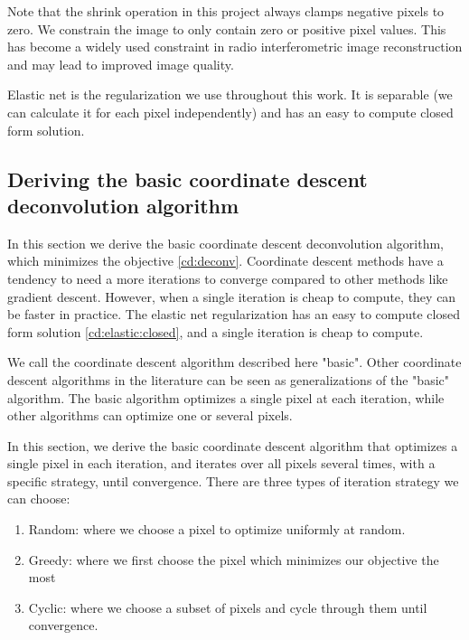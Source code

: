 
Note that the shrink operation in this project always clamps negative pixels to zero. We constrain the image to only contain zero or positive pixel values. This has become a widely used constraint in radio interferometric image reconstruction and may lead to improved image quality\cite{mcewen2011compressed}.

Elastic net is the regularization we use throughout this work. It is separable (we can calculate it for each pixel independently) and has an easy to compute closed form solution.


\subsection{Deriving the basic coordinate descent deconvolution algorithm}\label{cd:deriving}
In this section we derive the basic coordinate descent deconvolution algorithm, which minimizes the objective \eqref{cd:deconv}. Coordinate descent methods have a tendency to need a more iterations to converge compared to other methods like gradient descent. However, when a single iteration is cheap to compute, they can be faster in practice\cite{shalev2011stochastic}. The elastic net regularization has an easy to compute closed form solution \eqref{cd:elastic:closed}, and a single iteration is cheap to compute.

We call the coordinate descent algorithm described here "basic". Other coordinate descent algorithms in the literature\cite{richtarik2016parallel,fercoq2015accelerated, richtarik2016distributed} can be seen as generalizations of the "basic" algorithm. The basic algorithm optimizes a single pixel at each iteration, while other algorithms can optimize one or several pixels. 

In this section, we derive the basic coordinate descent algorithm that optimizes a single pixel in each iteration, and iterates over all pixels several times, with a specific strategy, until convergence. There are three types of iteration strategy we can choose:
\begin{enumerate}
	\item Random: where we choose a pixel to optimize uniformly at random.
	\item Greedy: where we first choose the pixel which minimizes our objective the most
	\item Cyclic: where we choose a subset of pixels and cycle through them until convergence. 
\end{enumerate}

